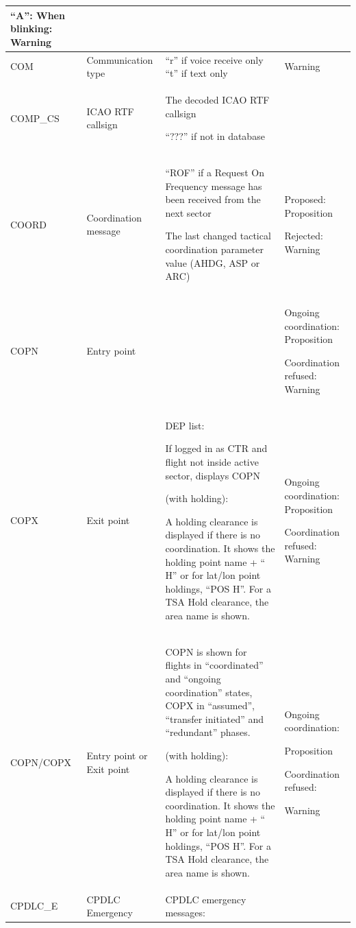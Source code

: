 \documentclass[11pt,a4paper,oldfontcommands]{memoir}
\begin{document}
\begin{longtable}{|p{2.5cm}|p{2.5cm}|p{4.5cm}|p{4.5cm}|}
      \bigskip
      
      “A”: When blinking: Warning \\ \hline
    COM &
      Communication type &
      “r” if voice receive only “t” if text only &
      Warning \\ \hline
    COMP\_CS &
      ICAO RTF callsign &
      The decoded ICAO RTF callsign 
      
      “???” if not in database &
       \\ \hline
    COORD &
      Coordination message &
      “ROF” if a Request On Frequency message has been received from  the next sector  
      \bigskip

      The last changed tactical coordination parameter value (AHDG, ASP or ARC) &
      Proposed: Proposition 
      
      Rejected: Warning \\ \hline
    COPN &
      Entry point &
       &
      Ongoing coordination:  Proposition 
      
      Coordination refused: Warning \\ \hline
    COPX &
      Exit point &
      DEP list: 
      
      If logged in as CTR and flight not inside active sector, displays COPN 
      \bigskip

      (with holding): 
      
      A holding clearance is displayed if  there is no coordination. It shows  the holding point name + “ H” or for  lat/lon point holdings, “POS H”. For a TSA Hold clearance, the area  name is shown. &
      Ongoing coordination: Proposition 
      
      Coordination refused: Warning \\ \hline
    COPN/COPX &
      Entry point or Exit point &
      COPN is shown for flights in  “coordinated” and “ongoing coordination” states, COPX in “assumed”, “transfer  initiated” and “redundant” phases. 
      \bigskip

      (with holding): 
      
      A holding clearance is displayed if  there is no coordination. It shows  the holding point name + “ H” or for  lat/lon point holdings, “POS H”. For a TSA Hold clearance, the area  name is shown. &
      Ongoing coordination: 
      
      Proposition 
      \bigskip
      
      Coordination refused: 
      
      Warning \\ \hline
    CPDLC\_E &
      CPDLC Emergency &
      CPDLC emergency messages: 
      

\end{longtable}
\end{document}
